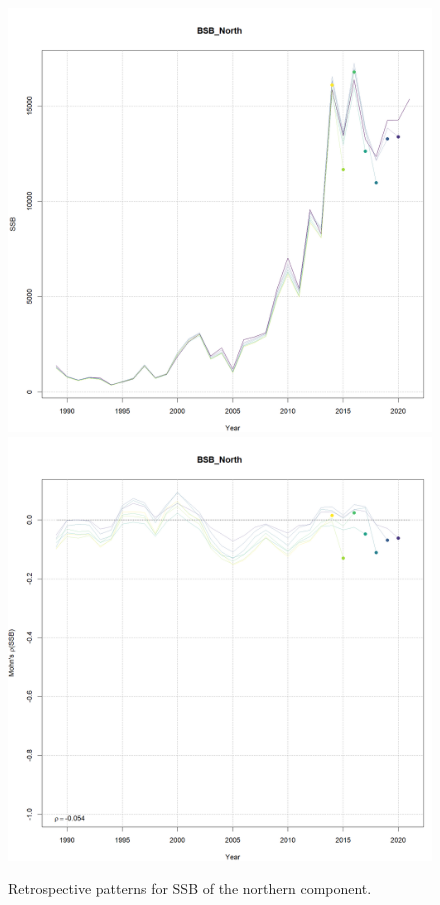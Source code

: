 \documentclass[
]{article}
\begin{document}
\begin{figure}

{\centering \includegraphics[width=0.65\linewidth]{../2023.RT.Runs/Run34/plots_png/retro/BSB_North_SSB_retro} \includegraphics[width=0.65\linewidth]{../2023.RT.Runs/Run34/plots_png/retro/BSB_North_SSB_retro_relative} 

}

\caption{Retrospective patterns for SSB of the northern component.}\label{fig:North-retro-ssb}
\end{figure}
\end{document}

